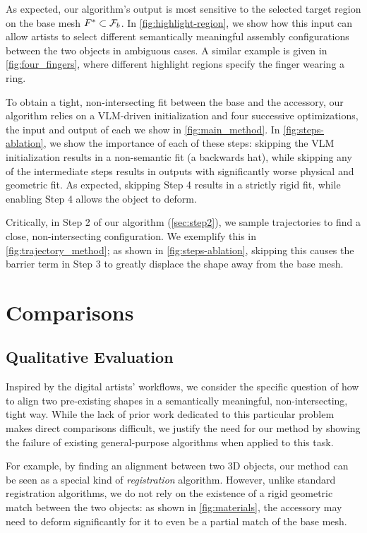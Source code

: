 As expected, our algorithm's output is most sensitive to the selected target region on the base mesh $F^*\subset \mathcal{F}_b$.
In \autoref{fig:highlight-region}, we show how this input can allow artists to select different semantically meaningful assembly configurations between the two objects in ambiguous cases.
A similar example is given in \autoref{fig:four_fingers}, where different highlight regions specify the finger wearing a ring.



To obtain a tight, non-intersecting fit between the base and the accessory, our algorithm relies on a VLM-driven initialization and four successive optimizations, the input and output of each we show in \autoref{fig:main_method}. In \autoref{fig:steps-ablation}, we show the importance of each of these steps: skipping the VLM initialization results in a non-semantic fit (a backwards hat), while skipping any of the intermediate steps results in outputs with significantly worse physical and geometric fit. As expected, skipping Step 4 results in a strictly rigid fit, while enabling Step 4 allows the object to deform.

Critically, in Step 2 of our algorithm (\autoref{sec:step2}), we sample trajectories to find a close, non-intersecting configuration. We exemplify this in \autoref{fig:trajectory_method}; as shown in \autoref{fig:steps-ablation}, skipping this causes the barrier term in Step 3 to greatly displace the shape away from the base mesh.



\section{Comparisons} \label{sec:comparisons}
\subsection{Qualitative Evaluation}
Inspired by the digital artists' workflows, we consider the specific question of how to align two pre-existing shapes in a semantically meaningful, non-intersecting, tight way.
While the lack of prior work dedicated to this particular problem makes direct comparisons difficult, we justify the need for our method by showing the failure of existing general-purpose algorithms when applied to this task.

For example, by finding an alignment between two 3D objects, our method can be seen as a special kind of \emph{registration} algorithm. However, unlike standard registration algorithms, we do not rely on the existence of a rigid geometric match between the two objects: as shown in \autoref{fig:materials}, the accessory may need to deform significantly for it to even be a partial match of the base mesh.

